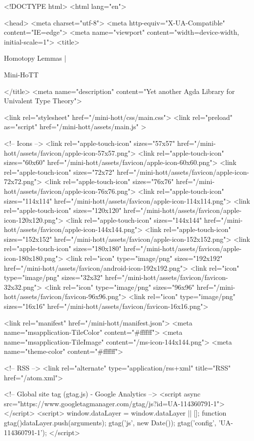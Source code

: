 <!DOCTYPE html>
<html lang="en">

<head>
  <meta charset="utf-8">
  <meta http-equiv="X-UA-Compatible" content="IE=edge">
  <meta name="viewport" content="width=device-width, initial-scale=1">
  <title>
    
      
        Homotopy Lemmas |
      
        Mini-HoTT
    
  </title>
  <meta name="description" content="Yet another Agda Library for Univalent Type Theory">

  <link rel="stylesheet" href="/mini-hott/css/main.css">
  <link rel="preload" as="script" href="/mini-hott/assets/main.js" >

  <!-- Icons -->
  <link rel="apple-touch-icon" sizes="57x57" href="/mini-hott/assets/favicon/apple-icon-57x57.png">
  <link rel="apple-touch-icon" sizes="60x60" href="/mini-hott/assets/favicon/apple-icon-60x60.png">
  <link rel="apple-touch-icon" sizes="72x72" href="/mini-hott/assets/favicon/apple-icon-72x72.png">
  <link rel="apple-touch-icon" sizes="76x76" href="/mini-hott/assets/favicon/apple-icon-76x76.png">
  <link rel="apple-touch-icon" sizes="114x114" href="/mini-hott/assets/favicon/apple-icon-114x114.png">
  <link rel="apple-touch-icon" sizes="120x120" href="/mini-hott/assets/favicon/apple-icon-120x120.png">
  <link rel="apple-touch-icon" sizes="144x144" href="/mini-hott/assets/favicon/apple-icon-144x144.png">
  <link rel="apple-touch-icon" sizes="152x152" href="/mini-hott/assets/favicon/apple-icon-152x152.png">
  <link rel="apple-touch-icon" sizes="180x180" href="/mini-hott/assets/favicon/apple-icon-180x180.png">
  <link rel="icon" type="image/png" sizes="192x192"  href="/mini-hott/assets/favicon/android-icon-192x192.png">
  <link rel="icon" type="image/png" sizes="32x32" href="/mini-hott/assets/favicon/favicon-32x32.png">
  <link rel="icon" type="image/png" sizes="96x96" href="/mini-hott/assets/favicon/favicon-96x96.png">
  <link rel="icon" type="image/png" sizes="16x16" href="/mini-hott/assets/favicon/favicon-16x16.png">

  <link rel="manifest" href="/mini-hott/manifest.json">
  <meta name="msapplication-TileColor" content="#ffffff">
  <meta name="msapplication-TileImage" content="/ms-icon-144x144.png">
  <meta name="theme-color" content="#ffffff">

  <!-- RSS -->
  <link rel="alternate" type="application/rss+xml" title="RSS" href="/atom.xml">

  <!-- Global site tag (gtag.js) - Google Analytics -->
  <script async src="https://www.googletagmanager.com/gtag/js?id=UA-114360791-1"></script>
  <script>
    window.dataLayer = window.dataLayer || [];
    function gtag(){dataLayer.push(arguments);}
    gtag('js', new Date());
    gtag('config', 'UA-114360791-1');
  </script>

